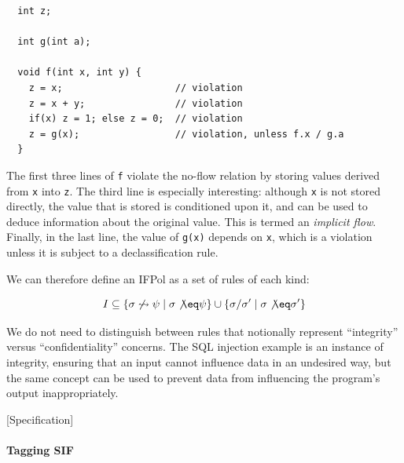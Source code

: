\documentclass[acmsmall,review,anonymous]{acmart}\settopmatter{printfolios=true,printccs=false,printacmref=false}
\begin{document}
\begin{verbatim}
  int z;

  int g(int a);

  void f(int x, int y) {
    z = x;                    // violation
    z = x + y;                // violation
    if(x) z = 1; else z = 0;  // violation
    z = g(x);                 // violation, unless f.x / g.a
  }
\end{verbatim}

The first three lines of {\tt f} violate the no-flow relation by storing values derived from
{\tt x} into {\tt z}. The third line is especially interesting: although {\tt x} is not stored
directly, the value that is stored is conditioned upon it, and can be used to deduce information
about the original value. This is termed an {\em implicit flow}. Finally, in the last line,
the value of {\tt g(x)} depends on {\tt x}, which is a violation unless it is subject to a
declassification rule.

We can therefore define an IFPol as a set of rules of each kind:

\[I \subseteq \{\sigma \not \rightsquigarrow \psi \mid \sigma \not \eq \psi\} \cup
\{\sigma / \sigma' \mid \sigma \not \eq \sigma'\}\]

We do not need to distinguish between rules that notionally represent ``integrity'' versus ``confidentiality''
concerns. The SQL injection example is an instance of integrity, ensuring that an input cannot influence data
in an undesired way, but the same concept can be used to prevent data from influencing the program's output
inappropriately.

[Specification]

\paragraph{Tagging SIF}
\end{document}
